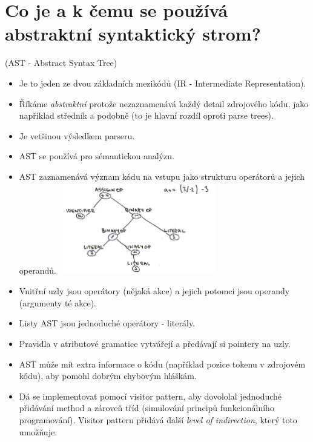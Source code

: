 \documentclass{article}
\begin{document}
\section{Co je a k čemu se používá abstraktní syntaktický strom?}\textcolor{myGray}{(AST - Abstract Syntax Tree)}
\begin{itemize}
    \item Je to jeden ze dvou základních mezikódů (IR - Intermediate Representation).
    \item Říkáme \emph{abstraktní} protože nezaznamenává každý detail zdrojového kódu, jako například středník a podobně (to je hlavní rozdíl oproti parse trees).
    \item Je vetšinou výsledkem parseru.
    \item AST se používá pro sémantickou analýzu.
    \item AST zaznamenává význam kódu na vstupu jako strukturu operátorů a jejich operandů.
    \includegraphics[width=7cm, height=4cm]{ast.jpg}
    \item Vnitřní uzly jsou operátory (nějaká akce) a jejich potomci jsou operandy (argumenty té akce).
    \item Listy AST jsou jednoduché operátory - literály.
    \item Pravidla v atributové gramatice vytvářejí a předávají si pointery na uzly.
    \item AST může mít extra informace o kódu (například pozice tokenu v zdrojovém kódu), aby pomohl dobrým chybovým hláškám.
    \item Dá se implementovat pomocí visitor pattern, aby dovololal jednoduché přidávání method a zároveň tříd (simulování principů funkcionálního programování). Visitor pattern přidává další \emph{level of indirection}, který toto umožňuje.
    

\end{itemize}
\end{document}
